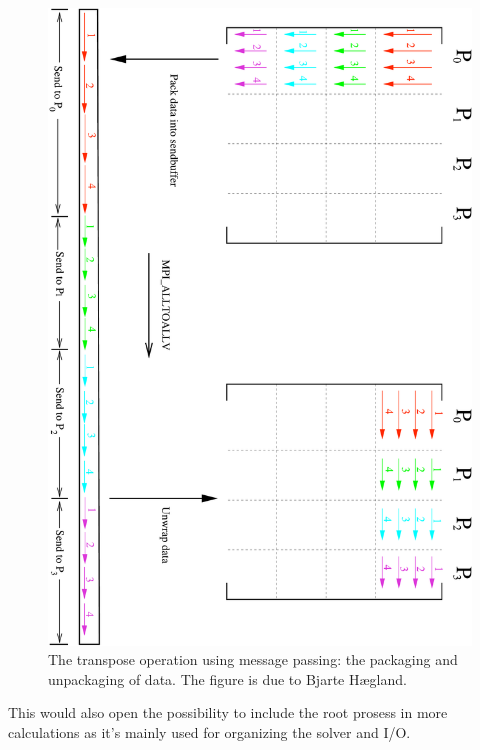 \begin{figure}[htbp]
	\centering
	\includegraphics[width=\textwidth]{illustrations/matrix_blocktranspose.pdf}
	\caption{The transpose operation using message passing: the packaging and unpackaging of data. The figure is due to Bjarte Hægland.}
	\label{fig:label}
\end{figure}



This would also open the possibility to include the root prosess in more calculations as it's mainly used for organizing the solver and I/O.





